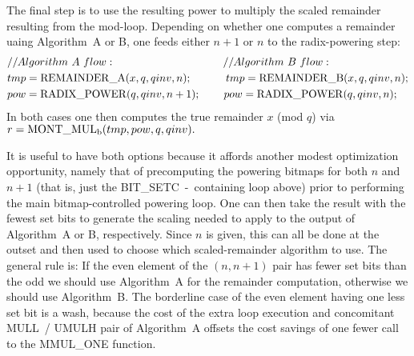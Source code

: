 \documentclass{article}
\begin{document}
\textheight=9in

The final step is to use the resulting power to multiply the scaled remainder resulting from the mod-loop. Depending on whether one computes a remainder uaing Algorithm~A or B, one feeds either $n+1$ or $n$ to the radix-powering step:
\begin{align}
\nonumber	&// Algorithm\ A\ flow:		\qquad\qquad\qquad\qquad\ \ \ \ \ \ // Algorithm\ B\ flow:\\
\nonumber	&tmp = {\rm REMAINDER\_A}(x,q,qinv,n);	\qquad\ \ \ \,	tmp = {\rm REMAINDER\_B}(x,q,qinv,n);\\
\nonumber	&pow = {\rm RADIX\_POWER}(q,qinv,n+1);	\qquad\,	pow = {\rm RADIX\_POWER}(q,qinv,n);
\end{align}
\noindent In both cases one then computes the true remainder $x$ (mod $q$) via $r = {\rm MONT\_MUL_b}(tmp,pow,q,qinv).$



It is useful to have both options because it affords another modest optimization opportunity, namely that of precomputing the powering bitmaps for both $n$ and $n+1$ (that is, just the BIT\_SETC~-~containing loop above) prior to performing the main bitmap-controlled powering loop. One can then take the result with the fewest set bits to generate the scaling needed to apply to the output of Algorithm~A or B, respectively. Since $n$ is given, this can all be done at the outset and then used to choose which scaled-remainder algorithm to use. The general rule is: If the even element of the $(n,n+1)$ pair has fewer set bits than the odd we should use Algorithm~A for the remainder computation, otherwise we should use Algorithm~B. The borderline case of the even element having one less set bit is a wash, because the cost of the extra loop execution and concomitant MULL~/ UMULH pair of Algorithm~A offsets the cost savings of one fewer call to the MMUL\_ONE function.
\end{document}
